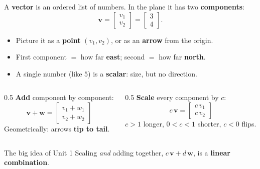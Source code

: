\documentclass[aspectratio=169, 11pt]{beamer}
\newcommand{\vv}{\mathbf{v}}
\newcommand{\ww}{\mathbf{w}}
\begin{document}
\begin{frame}[t, plain]
  A \textbf{vector} is an ordered list of numbers. In the plane it has two
  \textbf{components}:
  \[
    \vv = \begin{bmatrix} v_1 \\ v_2 \end{bmatrix}
        = \begin{bmatrix} 3 \\ 4 \end{bmatrix}.
  \]
  \begin{itemize}
    \item Picture it as a \textbf{point} $(v_1,v_2)$, or as an \textbf{arrow} from the origin.
    \item First component $=$ how far \textbf{east}; second $=$ how far \textbf{north}.
    \item A single number (like $5$) is a \textbf{scalar}: size, but no direction.
  \end{itemize}
\end{frame}

\begin{frame}[t, plain]
  \begin{columns}[T]
    \begin{column}{0.5\textwidth}
      \textbf{Add} component by component:
      \[
        \vv+\ww=\begin{bmatrix} v_1+w_1 \\ v_2+w_2 \end{bmatrix}
      \]
      Geometrically: arrows \textbf{tip to tail}.
    \end{column}
    \begin{column}{0.5\textwidth}
      \textbf{Scale} every component by $c$:
      \[
        c\,\vv=\begin{bmatrix} c\,v_1 \\ c\,v_2 \end{bmatrix}
      \]
      $c>1$ longer, $0<c<1$ shorter, $c<0$ flips.
    \end{column}
  \end{columns}
  \vspace{10pt}
  \begin{block}{The big idea of Unit 1}
    Scaling \emph{and} adding together, $c\,\vv + d\,\ww$, is a \textbf{linear combination}.
  \end{block}
\end{frame}
\end{document}
